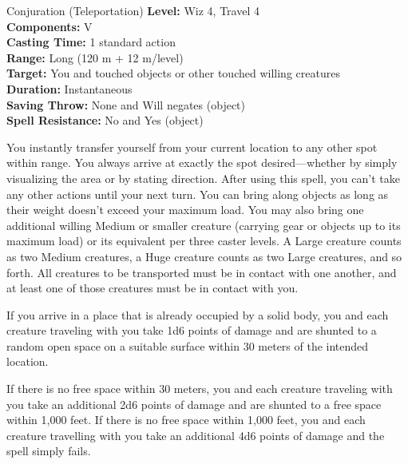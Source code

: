 {Conjuration (Teleportation)}
{
	\textbf{Level:}
	Wiz 4, Travel 4\\
	\textbf{Components:}
	V\\
	\textbf{Casting Time:}
	1 standard action\\
	\textbf{Range:}
	Long (120 m + 12 m/level)\\
	\textbf{Target:}
	You and touched objects or other touched willing creatures\\
	\textbf{Duration:}
	Instantaneous\\
	\textbf{Saving Throw:}
	None and Will negates (object)\\
	\textbf{Spell Resistance:}
	No and Yes (object)\\
}
{
	You instantly transfer yourself from your current location to any other spot within range. You always arrive at exactly the spot desired---whether by simply visualizing the area or by stating direction. After using this spell, you can't take any other actions until your next turn. You can bring along objects as long as their weight doesn't exceed your maximum load. You may also bring one additional willing Medium or smaller creature (carrying gear or objects up to its maximum load) or its equivalent per three caster levels. A Large creature counts as two Medium creatures, a Huge creature counts as two Large creatures, and so forth. All creatures to be transported must be in contact with one another, and at least one of those creatures must be in contact with you.

	If you arrive in a place that is already occupied by a solid body, you and each creature traveling with you take 1d6 points of damage and are shunted to a random open space on a suitable surface within 30 meters of the intended location.

	If there is no free space within 30 meters, you and each creature traveling with you take an additional 2d6 points of damage and are shunted to a free space within 1,000 feet. If there is no free space within 1,000 feet, you and each creature travelling with you take an additional 4d6 points of damage and the spell simply fails.

}
